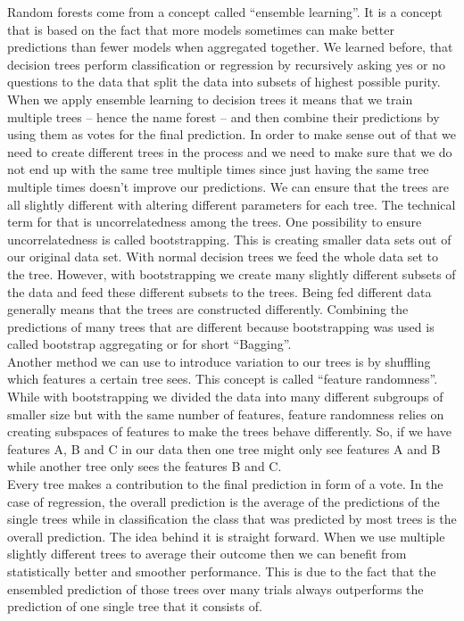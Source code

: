 \documentclass[a4paper,12pt]{report}
\begin{document}
	Random forests come from a concept called “ensemble learning”. It is a concept that is based on the fact that more models sometimes can make better predictions than fewer models when aggregated together. We learned before, that decision trees perform classification or regression by recursively asking yes or no questions to the data that split the data into subsets of highest possible purity.
When we apply ensemble learning to decision trees it means that we train multiple trees \cite{55} – hence the name forest – and then combine their predictions by using them as votes for the final prediction. In order to make sense out of that we need to create different trees in the process and we need to make sure that we do not end up with the same tree multiple times since just having the same tree multiple times doesn’t improve our predictions. We can ensure that the trees are all slightly different with altering different parameters for each tree. The technical term for that is uncorrelatedness among the trees. One possibility to ensure uncorrelatedness is called bootstrapping. This is creating smaller data sets out of our original data set. With normal decision trees we feed the whole data set to the tree. However, with bootstrapping we create many slightly different subsets of the data and feed these different subsets to the trees. Being fed different data generally means that the trees are constructed differently. Combining the predictions of many trees that are different because bootstrapping was used is called bootstrap aggregating or for short “Bagging”.\\
Another method we can use to introduce variation to our trees is by shuffling which features a certain tree sees. This concept is called “feature randomness”. While with bootstrapping we divided the data into many different subgroups of smaller size but with the same number of features, feature randomness relies on creating subspaces of features to make the trees behave differently. So, if we have features A, B and C in our data then one tree might only see features A and B while another tree only sees the features B and C.\\
Every tree makes a contribution to the final prediction in form of a vote. In the case of regression, the overall prediction is the average of the predictions of the single trees while in classification the class that was predicted by most trees is the overall prediction. The idea behind it is straight forward. When we use multiple slightly different trees to average their outcome then we can benefit from statistically better and smoother performance. This is due to the fact that the ensembled prediction of those trees over many trials always outperforms the prediction of one single tree that it consists of.
\end{document}
